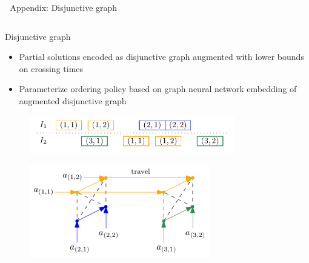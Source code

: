 \documentclass[bigger]{beamer}
\begin{document}
\begin{frame}[label={sec:org1fbd487}]{\(\;\)}
\centering
\color{structure}
\Large Appendix: Disjunctive graph
\normalsize
\vspace{2em}

\begin{columns}
\begin{column}{0.17\textwidth}
\end{column}

\begin{column}{0.83\textwidth}
\begin{itemize}

\end{itemize}
\end{column}
\end{columns}
\end{frame}
\begin{frame}[label={sec:orgf6f49cd}]{Disjunctive graph}
\begin{itemize}
\item Partial solutions encoded as disjunctive graph augmented with lower bounds on crossing times
\item Parameterize ordering policy based on graph neural network embedding of augmented disjunctive graph
\end{itemize}

\begin{figure}
  \centering
  \includegraphics[width=0.8\textwidth]{figures/network_bilevel-1.pdf}
\end{figure}

\begin{figure}
  \centering
  \includegraphics[width=0.7\textwidth]{figures/disjunctive_graph_variant.pdf}
\end{figure}
\end{frame}
\end{document}

